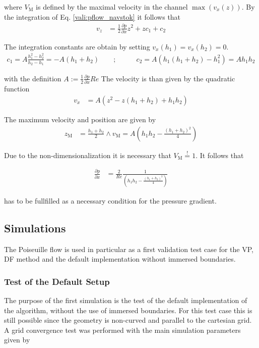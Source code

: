 where $V_\text{M}$ is defined by the maximal velocity in the channel $\max(v_x(z))$.
By the integration of Eq. \ref{vali:pflow_navstok} it follows that
\begin{align}
v_z &= \frac{1}{2}\frac{\partial p}{\partial x}z^2 + zc_1 + c_2
\end{align}

The integration constants are obtain by setting $v_x(h_1) = v_x(h_2) = 0$.
\begin{align}
c_1 = A\frac{h_1^2 -h_2^2}{h_2 - h_1} = -A(h_1+h_2)\qquad ;& \qquad
c_2 = A(h_1(h_1 + h_2) - h_1^2) = Ah_1h_2
\end{align}

with the definition $A:=\frac{1}{2}\frac{\partial p}{\partial x} Re$
The velocity is than given by the quadratic function
\begin{align}
\label{vali:pflow_theosol}
v_x &= A(z^2 - z(h_1 + h_2) + h_1h_2)
\end{align}

The maximum velocity and position are given by
\begin{align}
z_{\text{M}} &= \frac{h_1+h_2}{2} \wedge v_{\text{M}} = A\left(h_1h_2 - \frac{(h_1 + h_2)^2}{4}\right)
\end{align}

Due to the non-dimensionalization it is necessary that $V_{\text{M}} \overset{!}{=}  1$.
It follows that

\begin{align}
\frac{\partial p}{\partial x} &= \frac{2}{Re}\frac{1}{\left(h_1h_2 - \frac{(h_1+h_2)^2}{4} \right)}
\end{align}

has to be fullfilled as a necessary condition for the pressure gradient.

\subsection{Simulations}

The Poiseuille flow is used in particular as a first validation test case
for the VP, DF method  and the default implementation without immersed boundaries.

\subsubsection{Test of the Default Setup}

The purpose of the first simulation is the test of the default
implementation of the algorithm, without the use of immersed boundaries.
For this test case this is still possible since the geometry is non-curved
and parallel to the cartesian grid.
A grid convergence test was performed with the main simulation parameters given by

